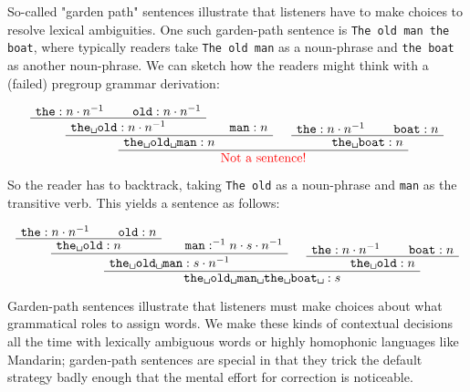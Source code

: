 \begin{example}
So-called "garden path" sentences illustrate that listeners have to make choices to resolve lexical ambiguities. One such garden-path sentence is \texttt{The old man the boat}, where typically readers take \texttt{The old man} as a noun-phrase and \texttt{the boat} as another noun-phrase. We can sketch how the readers might think with a (failed) pregroup grammar derivation:

\[
\AxiomC{$\texttt{the} : n \cdot n^{-1}$}
\AxiomC{$\texttt{old} : n \cdot n^{-1}$}
\BinaryInfC{$\texttt{the\textvisiblespace old}: n \cdot n^{-1}$}
\AxiomC{$\texttt{man} : n$}
\BinaryInfC{$\texttt{the\textvisiblespace old\textvisiblespace man}: n$}
\AxiomC{$\texttt{the} : n \cdot n^{-1}$}
\AxiomC{$\texttt{boat} : n$}
\BinaryInfC{$\texttt{the\textvisiblespace boat}: n$}
\BinaryInfC{\textcolor{red}{Not a sentence!}}
\DisplayProof
\]

So the reader has to backtrack, taking \texttt{The old} as a noun-phrase and \texttt{man} as the transitive verb. This yields a sentence as follows:

\[
\AxiomC{$\texttt{the} : n \cdot n^{-1}$}
\AxiomC{$\texttt{old} : n$}
\BinaryInfC{$\texttt{the\textvisiblespace old}: n$}
\AxiomC{$\texttt{man} : ^{-1}n \cdot s \cdot n^{-1}$}
\BinaryInfC{$\texttt{the\textvisiblespace old\textvisiblespace man}: s \cdot n^{-1}$}
\AxiomC{$\texttt{the} : n \cdot n^{-1}$}
\AxiomC{$\texttt{boat} : n$}
\BinaryInfC{$\texttt{the\textvisiblespace old}: n$}
\BinaryInfC{$\texttt{the\textvisiblespace old\textvisiblespace man\textvisiblespace the\textvisiblespace boat\textvisiblespace}: s$}
\DisplayProof
\]

Garden-path sentences illustrate that listeners must make choices about what grammatical roles to assign words. We make these kinds of contextual decisions all the time with lexically ambiguous words or highly homophonic languages like Mandarin; garden-path sentences are special in that they trick the default strategy badly enough that the mental effort for correction is noticeable.
\end{example}

